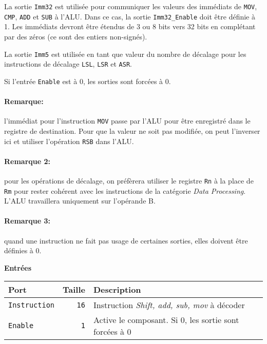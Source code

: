\documentclass{article}
\begin{document}
    La sortie \texttt{Imm32} est utilisée pour communiquer les valeurs des immédiats de \texttt{MOV}, \texttt{CMP}, \texttt{ADD} et \texttt{SUB} à l'ALU. Dans ce cas, la sortie \texttt{Imm32\_Enable} doit être définie à 1.
    Les immédiats devront être étendus de 3 ou 8 bits vers 32 bits en complétant par des zéros (ce sont des entiers non-signés).

    La sortie \texttt{Imm5} est utilisée en tant que valeur du nombre de décalage pour les instructions de décalage \texttt{LSL}, \texttt{LSR} et \texttt{ASR}.

    Si l'entrée \texttt{Enable} est à 0, les sorties sont forcées à 0.

    \paragraph{Remarque:} l'immédiat pour l'instruction \texttt{MOV} passe par l'ALU pour être enregistré dans le registre de destination.
    Pour que la valeur ne soit pas modifiée, on peut l'inverser ici et utiliser l'opération \texttt{RSB} dans l'ALU.

    \paragraph{Remarque 2:} pour les opérations de décalage, on préfèrera utiliser le registre \texttt{Rn} à la place de \texttt{Rm} pour rester cohérent avec les instructions de la catégorie \textit{Data Processing}.
    L'ALU travaillera uniquement sur l'opérande B.

    \paragraph{Remarque 3:} quand une instruction ne fait pas usage de certaines sorties, elles doivent être définies à 0.



    \textbf{Entrées}\\

    \begin{tabular}{|l|r|l|}
        \hline
        \textbf{Port}        & \textbf{Taille} & \textbf{Description}                                \\
        \hline

        \texttt{Instruction} & \texttt{16}     & Instruction \textit{Shift, add, sub, mov} à décoder \\
        \hline
        \texttt{Enable} & \texttt{1} & Active le composant.
        Si 0, les sortie sont forcées à 0 \\


        \hline
    \end{tabular}
\end{document}
